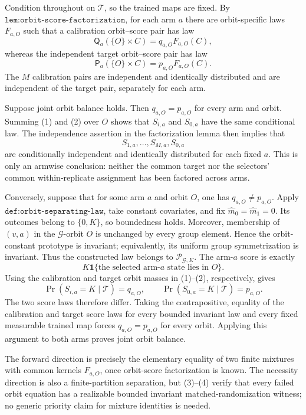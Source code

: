 Condition throughout on \(\mathcal T\), so the trained maps are fixed. By \(\texttt{lem:orbit-score-factorization}\), for each arm \(a\) there are orbit-specific laws \(F_{a,O}\) such that a calibration orbit--score pair has law
\[
\mathsf Q_a(\{O\}\times C)=q_{a,O}F_{a,O}(C),
\tag{1}
\]
whereas the independent target orbit--score pair has law
\[
\mathsf P_a(\{O\}\times C)=p_{a,O}F_{a,O}(C).
\tag{2}
\]
The \(M\) calibration pairs are independent and identically distributed and are independent of the target pair, separately for each arm.

Suppose joint orbit balance holds. Then \(q_{a,O}=p_{a,O}\) for every arm and orbit. Summing (1) and (2) over \(O\) shows that \(S_{i,a}\) and \(S_{0,a}\) have the same conditional law. The independence assertion in the factorization lemma then implies that
\[
S_{1,a},\ldots,S_{M,a},S_{0,a}
\]
are conditionally independent and identically distributed for each fixed \(a\). This is only an armwise conclusion: neither the common target nor the selectors' common within-replicate assignment has been factored across arms.

Conversely, suppose that for some arm \(a\) and orbit \(O\), one has \(q_{a,O}\ne p_{a,O}\). Apply \(\texttt{def:orbit-separating-law}\), take constant covariates, and fix \(\widehat m_0=\widehat m_1=0\). Its outcomes belong to \(\{0,K\}\), so boundedness holds. Moreover, membership of \((v,a)\) in the \(\mathcal G\)-orbit \(O\) is unchanged by every group element. Hence the orbit-constant prototype is invariant; equivalently, its uniform group symmetrization is invariant. Thus the constructed law belongs to \(\mathcal P_{\mathcal G,K}\). The arm-\(a\) score is exactly
\[
K\mathbf 1\{\text{the selected arm-}a\text{ state lies in }O\}.
\tag{3}
\]
Using the calibration and target orbit masses in (1)--(2), respectively, gives
\[
\Pr(S_{i,a}=K\mid\mathcal T)=q_{a,O},\qquad
\Pr(S_{0,a}=K\mid\mathcal T)=p_{a,O}.
\tag{4}
\]
The two score laws therefore differ. Taking the contrapositive, equality of the calibration and target score laws for every bounded invariant law and every fixed measurable trained map forces \(q_{a,O}=p_{a,O}\) for every orbit. Applying this argument to both arms proves joint orbit balance.

The forward direction is precisely the elementary equality of two finite mixtures with common kernels \(F_{a,O}\), once orbit-score factorization is known. The necessity direction is also a finite-partition separation, but (3)--(4) verify that every failed orbit equation has a realizable bounded invariant matched-randomization witness; no generic priority claim for mixture identities is needed.